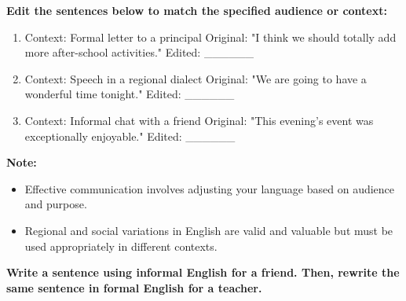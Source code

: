 \documentclass[12pt]{article}
\begin{document}
\vspace{1em}

\begin{tcolorbox}[colframe=black!60, colback=white, 
coltitle=black, colbacktitle=black!15, fonttitle=\bfseries\Large, 
title=Editing Exercises, halign title=center, left=10pt, right=10pt, top=10pt, bottom=15pt]
\textbf{Edit the sentences below to match the specified audience or context:}
\begin{enumerate}[itemsep=3em]
    \item Context: Formal letter to a principal  
    Original: "I think we should totally add more after-school activities."  
    Edited: \_\_\_\_\_\_

    \item Context: Speech in a regional dialect  
    Original: "We are going to have a wonderful time tonight."  
    Edited: \_\_\_\_\_\_

    \item Context: Informal chat with a friend  
    Original: "This evening's event was exceptionally enjoyable."  
    Edited: \_\_\_\_\_\_
\end{enumerate}
\end{tcolorbox}

\vspace{1em}

\begin{tcolorbox}[colframe=black!40, colback=gray!5, 
coltitle=black, colbacktitle=black!20, fonttitle=\bfseries\Large, 
title=Additional Notes, halign title=center, left=5pt, right=5pt, top=5pt, bottom=15pt]
\textbf{Note:}
\begin{itemize}
    \item Effective communication involves adjusting your language based on audience and purpose.
    \item Regional and social variations in English are valid and valuable but must be used appropriately in different contexts.
\end{itemize}
\end{tcolorbox}

\vspace{1em}

\begin{tcolorbox}[colframe=black!60, colback=white, 
coltitle=black, colbacktitle=black!15, fonttitle=\bfseries\Large, 
title=Exit Ticket, halign title=center, left=10pt, right=10pt, top=5pt, bottom=15pt]

\textbf{Write a sentence using informal English for a friend. Then, rewrite the same sentence in formal English for a teacher.}

\vspace{8em}

\end{tcolorbox}
\end{document}
